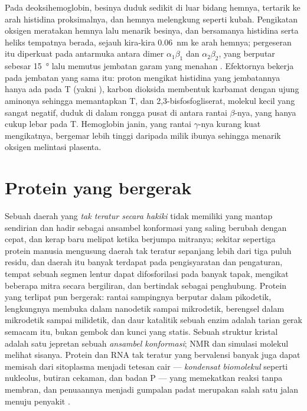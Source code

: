 \begin{proposition}\label{prop:b3:structural-biology:mechanism}
Pada deoksihemoglobin, besinya duduk sedikit di luar bidang hemnya, tertarik
ke arah histidina proksimalnya, dan hemnya melengkung seperti kubah. Pengikatan
oksigen meratakan hemnya lalu menarik besinya, dan bersamanya histidina serta
heliks tempatnya berada, sejauh kira-kira \qty{0.06}{nm} ke arah
hemnya; pergeseran itu diperkuat pada antarmuka antara dimer
$\alpha_{1}\beta_{1}$ dan $\alpha_{2}\beta_{2}$, yang berputar sebesar
\qty{15}{\degree} lalu memutus jembatan garam yang menahan .
Efektornya bekerja pada jembatan yang sama itu: proton mengikat histidina yang
jembatannya hanya ada pada T (yakni ), karbon dioksida membentuk
karbamat dengan ujung aminonya sehingga memantapkan T, dan
2,3-bisfosfogliserat, molekul kecil yang sangat negatif, duduk di dalam rongga
pusat di antara rantai $\beta$-nya, yang hanya cukup lebar pada T. Hemoglobin
janin, yang rantai $\gamma$-nya kurang kuat mengikatnya, bergemar lebih tinggi
daripada milik ibunya sehingga menarik oksigen melintasi plasenta.
\end{proposition}

\section{Protein yang bergerak}

\begin{definition}\label{def:b3:structural-biology:disorder}
%
Sebuah daerah yang \emph{tak teratur secara hakiki} tidak memiliki 
yang mantap sendirian dan hadir sebagai ansambel konformasi yang saling
berubah dengan cepat, dan kerap baru melipat ketika berjumpa mitranya; sekitar
sepertiga protein manusia mengusung daerah tak teratur sepanjang lebih dari
tiga puluh residu, dan daerah itu banyak terdapat pada pengisyaratan dan
pengaturan, tempat sebuah segmen lentur dapat difosforilasi pada banyak tapak,
mengikat beberapa mitra secara bergiliran, dan bertindak sebagai penghubung.
Protein yang terlipat pun bergerak: rantai sampingnya berputar dalam
pikodetik, lengkungnya membuka dalam nanodetik sampai mikrodetik, 
berengsel dalam mikrodetik sampai milidetik, dan daur katalitik sebuah enzim
adalah tarian gerak semacam itu, bukan gembok dan kunci yang statis. Sebuah
struktur kristal adalah satu jepretan sebuah \emph{ansambel konformasi}; NMR
dan simulasi molekul melihat sisanya. Protein dan RNA tak teratur yang
bervalensi banyak juga dapat memisah dari sitoplasma menjadi tetesan cair ---
\emph{kondensat biomolekul} seperti nukleolus, butiran cekaman, dan badan P ---
yang memekatkan reaksi tanpa membran, dan penuaannya menjadi gumpalan padat
merupakan salah satu jalan menuju penyakit .
\end{definition}

